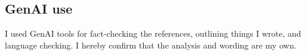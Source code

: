 \documentclass[11pt,a4paper]{article}
\begin{document}
\subsection*{GenAI use}
I used GenAI tools for fact-checking the references, outlining things I wrote, and language checking. I hereby confirm that the analysis and wording are my own.



\end{document}
